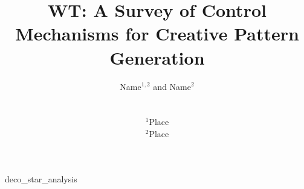 \documentclass{egpubl}
\title[A Survey of Control Mechanisms for Creative Pattern Generation]%
      {WT: A Survey of Control Mechanisms for Creative Pattern Generation}
\author[Name \& Name]
{\parbox{\textwidth}{\centering Name$^{1,2}$ and Name$^{2}$}
        \\
{\parbox{\textwidth}{\centering $^1$Place\\
         $^2$Place
       }
}
}
\begin{document}

\maketitle

{deco_star_analysis}


%  
%        

\printbibliography                

\end{document}
